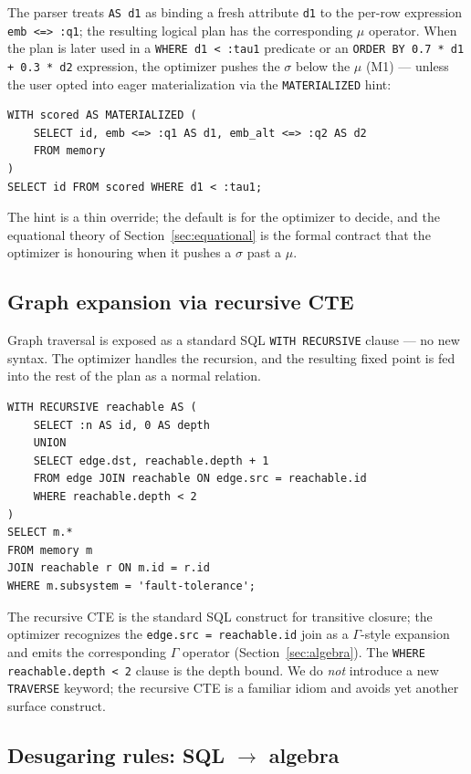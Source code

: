 \documentclass[sigconf,nonacm,review]{acmart}
\theoremstyle{plain}
\theoremstyle{definition}
\theoremstyle{remark}
\begin{document}
The parser treats \texttt{AS d1} as binding a fresh attribute
\texttt{d1} to the per-row expression \texttt{emb <=> :q1};
the resulting logical plan has the corresponding $\mu$
operator. When the plan is later used in a
\texttt{WHERE d1 < :tau1} predicate or an
\texttt{ORDER BY 0.7 * d1 + 0.3 * d2} expression, the
optimizer pushes the $\sigma$ below the $\mu$ (M1) --- unless
the user opted into eager materialization via the
\texttt{MATERIALIZED} hint:

\begin{lstlisting}
WITH scored AS MATERIALIZED (
    SELECT id, emb <=> :q1 AS d1, emb_alt <=> :q2 AS d2
    FROM memory
)
SELECT id FROM scored WHERE d1 < :tau1;
\end{lstlisting}

The hint is a thin override; the default is for the optimizer
to decide, and the equational theory of
Section~\ref{sec:equational} is the formal contract that the
optimizer is honouring when it pushes a $\sigma$ past a $\mu$.

\subsection{Graph expansion via recursive CTE}\label{sec:sql:graph}

Graph traversal is exposed as a standard SQL
\texttt{WITH RECURSIVE} clause --- no new syntax. The
optimizer handles the recursion, and the resulting fixed point
is fed into the rest of the plan as a normal relation.

\begin{lstlisting}
WITH RECURSIVE reachable AS (
    SELECT :n AS id, 0 AS depth
    UNION
    SELECT edge.dst, reachable.depth + 1
    FROM edge JOIN reachable ON edge.src = reachable.id
    WHERE reachable.depth < 2
)
SELECT m.*
FROM memory m
JOIN reachable r ON m.id = r.id
WHERE m.subsystem = 'fault-tolerance';
\end{lstlisting}

The recursive CTE is the standard SQL construct for transitive
closure; the optimizer recognizes the
\texttt{edge.src = reachable.id} join as a $\Gamma$-style
expansion and emits the corresponding $\Gamma$ operator
(Section~\ref{sec:algebra}). The \texttt{WHERE
reachable.depth < 2} clause is the depth bound. We do
\emph{not} introduce a new \texttt{TRAVERSE} keyword; the
recursive CTE is a familiar idiom and avoids yet another
surface construct.

\subsection{Desugaring rules: SQL $\rightarrow$ algebra}\label{sec:sql:desugaring}
\end{document}
